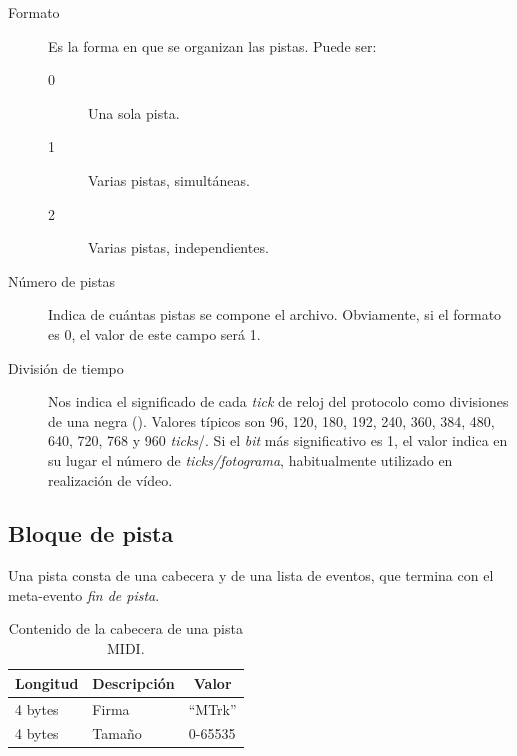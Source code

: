 \begin{description}
	\item[Formato] Es la forma en que se organizan las pistas. Puede ser:
	\begin{description}
		\item[0] Una sola pista.
		\item[1] Varias pistas, simultáneas.
		\item[2] Varias pistas, independientes.
	\end{description}
	
	\item[Número de pistas] Indica de cuántas pistas se compone el archivo. Obviamente, si el formato es 0, el valor de este campo será 1.
	
	\item[División de tiempo] Nos indica el significado de cada \textit{tick} de reloj del protocolo como divisiones de una negra (\quarternote). Valores típicos son 96, 120, 180, 192, 240, 360, 384, 480, 640, 720, 768 y 960 \textit{ticks}/\quarternote. Si el \textit{bit} más significativo es 1, el valor indica en su lugar el número de \textit{ticks/fotograma}, habitualmente utilizado en realización de vídeo.
\end{description}

\subsection{Bloque de pista}

Una pista consta de una cabecera y de una lista de eventos, que termina con el meta-evento \textit{fin de pista}.

\smallskip

\begin{table}[H]
	\begin{center}
		\begin{tabular}{|l|l|l|}
			\hline \multicolumn{1}{|c|}{\textbf{Longitud}} & \multicolumn{1}{c|}{\textbf{Descripción}} & \multicolumn{1}{c|}{\textbf{Valor}} \\
			\hline 4 bytes & Firma & ``MTrk'' \\ 
			\hline 4 bytes & Tamaño & 0-65535 \\  
			\hline 
		\end{tabular}
		\smallskip
		\caption{\label{tab:midi_track} Contenido de la cabecera de una pista MIDI.}
	\end{center}
\end{table}

\smallskip

